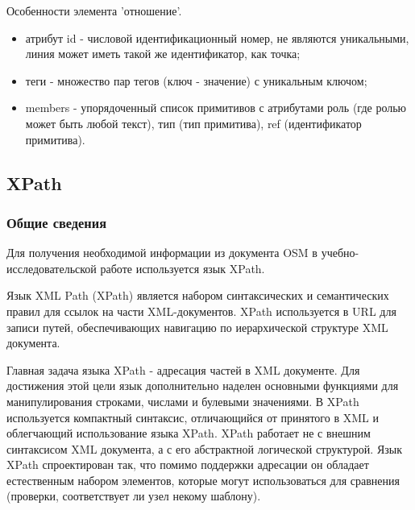\documentclass[12pt,a4paper,oneside]{article} %
\begin{document}
Особенности элемента 'отношение'.
\begin{itemize}
\item атрибут id - числовой идентификационный номер, не являются \linebreak
уникальными, линия может иметь такой же идентификатор, как точка;
\item теги - множество пар тегов (ключ - значение) с уникальным ключом;
\item members - упорядоченный список примитивов с атрибутами роль \linebreak
(где ролью может быть любой текст), тип (тип примитива), \linebreak
ref (идентификатор примитива).
\end{itemize}

\newpage
\subsection{XPath}
\subsubsection{Общие сведения}
Для получения необходимой информации из документа OSM в \linebreak
учебно-исследовательской работе используется язык XPath.

Язык XML Path (XPath) является набором синтаксических \linebreak
и семантических правил для ссылок на части XML-документов.\linebreak
XPath используется в URL для записи путей, обеспечивающих \linebreak
навигацию по иерархической структуре XML документа.

Главная задача языка XPath - адресация частей в XML документе. Для \linebreak
достижения этой цели язык дополнительно наделен основными функциями \linebreak
для манипулирования строками, числами и булевыми значениями. В XPath \linebreak
используется компактный синтаксис, отличающийся от принятого в XML \linebreak
и облегчающий использование языка XPath. XPath работает не с внешним \linebreak
синтаксисом XML документа, а с его абстрактной логической структурой. \linebreak
Язык XPath спроектирован так, что помимо поддержки адресации он \linebreak
обладает естественным набором элементов, которые могут использоваться \linebreak
для сравнения (проверки, соответствует ли узел некому шаблону).
\end{document}
